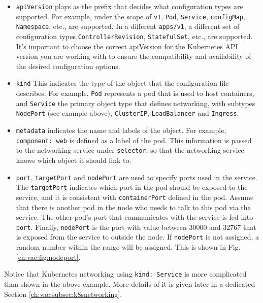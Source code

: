 \begin{itemize}
  \item \verb|apiVersion| plays as the prefix that decides what configuration types are supported. For example, under the scope of \verb|v1|, \verb|Pod|, \verb|Service|, \verb|configMap|, \verb|Namespace|, etc., are supported. In a different \verb|apps/v1|, a different set of configuration types \verb|ControllerRevision|, \verb|StatefulSet|, etc., are supported. It's important to choose the correct apiVersion for the Kubernetes API version you are working with to ensure the compatibility and availability of the desired configuration options.
  \item \verb|kind| This indicates the type of the object that the configuration file describes. For example, \verb|Pod| represents a pod that is used to host containers, and \verb|Service| the primary object type that defines networking, with subtypes \verb|NodePort| (see example above), \verb|ClusterIP|, \verb|LoadBalancer| and \verb|Ingress|.
  \item \verb|metadata| indicates the name and labels of the object. For example, \verb|component: web| is defined as a label of the pod. This information is passed to the networking service under \verb|selector|, so that the networking service knows which object it should link to.
  \item \verb|port|, \verb|targetPort| and \verb|nodePort| are used to specify ports used in the service. The \verb|targetPort| indicates which port in the pod should be exposed to the service, and it is consistent with \verb|containerPort| defined in the pod. Assume that there is another pod in the node who needs to talk to this pod via the service. The other pod's port that communicates with the service is fed into \verb|port|. Finally, \verb|nodePort| is the port with value between 30000 and 32767 that is exposed from the service to outside the node. If \verb|nodePort| is not assigned, a random number within the range will be assigned. This is shown in Fig. \ref{ch:vac:fig:nodeport}.
\end{itemize}
Notice that Kubernetes networking using \verb|kind: Service| is more complicated than shown in the above example. More details of it is given later in a dedicated Section \ref{ch:vac:subsec:k8snetworking}.

